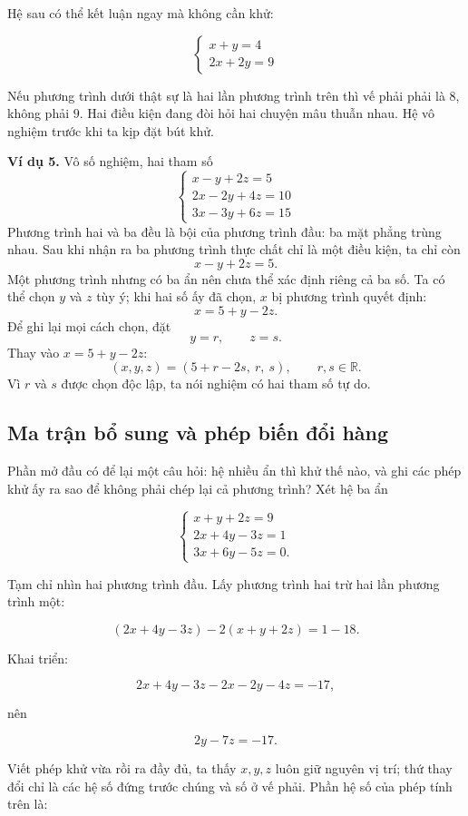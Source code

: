 \documentclass[12pt,a4paper]{article}
\begin{document}
Hệ sau có thể kết luận ngay mà không cần khử:

$$ \begin{cases} x+y=4\\ 2x+2y=9 \end{cases} $$

Nếu phương trình dưới thật sự là hai lần phương trình trên thì vế phải phải là \(8\), không phải \(9\). Hai điều kiện đang đòi hỏi hai chuyện mâu thuẫn nhau. Hệ vô nghiệm trước khi ta kịp đặt bút khử.

\textbf{Ví dụ 5.} Vô số nghiệm, hai tham số
$$\begin{cases} x - y + 2z = 5 \\ 2x - 2y + 4z = 10 \\ 3x - 3y + 6z = 15 \end{cases}$$
Phương trình hai và ba đều là bội của phương trình đầu: ba mặt phẳng trùng nhau. Sau khi nhận ra ba phương trình thực chất chỉ là một điều kiện, ta chỉ còn
$$ x-y+2z=5. $$
Một phương trình nhưng có ba ẩn nên chưa thể xác định riêng cả ba số. Ta có thể chọn \(y\) và \(z\) tùy ý; khi hai số ấy đã chọn, \(x\) bị phương trình quyết định:
$$ x=5+y-2z. $$
Để ghi lại mọi cách chọn, đặt
$$ y=r,\qquad z=s. $$
Thay vào \(x=5+y-2z\):
$$ (x,y,z)=(5+r-2s,\ r,\ s),\qquad r,s\in\mathbb R. $$
Vì \(r\) và \(s\) được chọn độc lập, ta nói nghiệm có hai tham số tự do.

\subsection{Ma trận bổ sung và phép biến đổi hàng}

Phần mở đầu có để lại một câu hỏi: hệ nhiều ẩn thì khử thế nào, và ghi các phép khử ấy ra sao để không phải chép lại cả phương trình? Xét hệ ba ẩn

$$ \begin{cases} x+y+2z=9\\ 2x+4y-3z=1\\ 3x+6y-5z=0. \end{cases} $$

Tạm chỉ nhìn hai phương trình đầu. Lấy phương trình hai trừ hai lần phương trình một:

$$ (2x+4y-3z)-2(x+y+2z)=1-18. $$

Khai triển:

$$ 2x+4y-3z-2x-2y-4z=-17, $$

nên

$$ 2y-7z=-17. $$

Viết phép khử vừa rồi ra đầy đủ, ta thấy \(x,y,z\) luôn giữ nguyên vị trí; thứ thay đổi chỉ là các hệ số đứng trước chúng và số ở vế phải. Phần hệ số của phép tính trên là:
\end{document}
